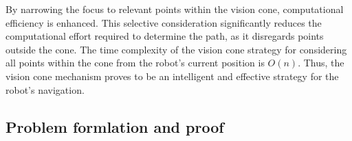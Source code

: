 By narrowing the focus to relevant points within the vision cone, computational efficiency is enhanced. This selective consideration significantly reduces the computational effort required to determine the path, as it disregards points outside the cone. The time complexity of the vision cone strategy for considering all points within the cone from the robot's current position is $O(n)$. Thus, the vision cone mechanism proves to be an intelligent and effective strategy for the robot's navigation.


\vspace*{6mm}  


\subsection{Problem formlation and proof}







